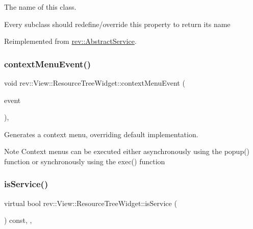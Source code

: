 The name of this class. 

Every subclass should redefine/override this property to return its name 

Reimplemented from \mbox{\hyperlink{classrev_1_1_abstract_service_a0b64ee4651db7637a70265697ca62453}{rev\+::\+Abstract\+Service}}.

\mbox{\label{classrev_1_1_view_1_1_resource_tree_widget_ac565478e3b3f618414c7a1762bfd86c7}} 
\subsubsection{\texorpdfstring{contextMenuEvent()}{contextMenuEvent()}}
{\footnotesize\ttfamily void rev\+::\+View\+::\+Resource\+Tree\+Widget\+::context\+Menu\+Event (\begin{DoxyParamCaption}\item[{Q\+Context\+Menu\+Event $\ast$}]{event }\end{DoxyParamCaption})\hspace{0.3cm}{\ttfamily [override]}, {\ttfamily [protected]}}



Generates a context menu, overriding default implementation. 

\begin{DoxyNote}{Note}
Context menus can be executed either asynchronously using the popup() function or synchronously using the exec() function 
\end{DoxyNote}
\mbox{\label{classrev_1_1_view_1_1_resource_tree_widget_ac26fb5177b9370d3ba293ad75bf28bee}} 
\subsubsection{\texorpdfstring{isService()}{isService()}}
{\footnotesize\ttfamily virtual bool rev\+::\+View\+::\+Resource\+Tree\+Widget\+::is\+Service (\begin{DoxyParamCaption}{ }\end{DoxyParamCaption}) const\hspace{0.3cm}{\ttfamily [inline]}, {\ttfamily [override]}, {\ttfamily [virtual]}}



